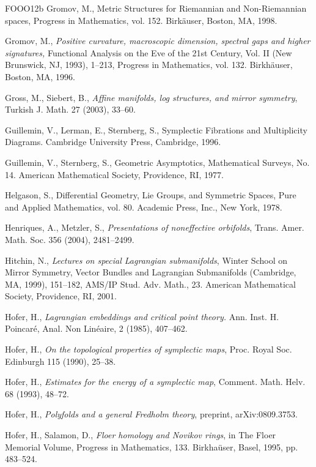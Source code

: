\begin{thebibliography}{FOOO12b}
 Gromov, M., Metric Structures for Riemannian and Non-Riemannian spaces, Progress in
  Mathematics, vol. 152. Birkäuser, Boston, MA, 1998.

 Gromov, M., \emph{Positive curvature, macroscopic dimension, spectral gaps and
  higher signatures,} Functional Analysis on the Eve of the 21st Century, Vol. II (New Brunswick, NJ,
  1993), 1–213, Progress in Mathe\-matics, vol. 132. Birkhäuser, Boston, MA, 1996.

 Gross, M., Siebert, B., \emph{Aﬃne manifolds, log structures, and mirror
  symmetry}, Turkish J. Math. 27 (2003), 33–60.

 Guillemin, V., Lerman, E., Sternberg, S., Symplectic Fibrations and Multiplicity
  Diagrams. Cambridge University Press, Cambridge, 1996.

 Guillemin, V., Sternberg, S., Geometric Asymptotics, Mathematical Surveys, No. 14.
  American Mathematical Society, Providence, RI, 1977.

 Helgason, S., Diﬀerential Geometry, Lie Groups, and Symmetric Spaces, Pure and
  Applied Mathematics, vol. 80. Academic Press, Inc., New York, 1978.

 Henriques, A., Metzler, S., \emph{Presentations of noneﬀective orbifolds}, Trans.
  Amer. Math. Soc. 356 (2004), 2481–2499.

 Hitchin, N., \emph{Lectures on special Lagrangian submanifolds}, Winter School on
  Mirror Symmetry, Vector Bundles and Lagrangian Submani\-folds (Cambridge, MA, 1999), 151–182, AMS/IP
  Stud. Adv. Math., 23. American Mathematical Society, Providence, RI, 2001.

 Hofer, H., \emph{Lagrangian embeddings and critical point theory.} Ann. Inst. H.
  Poincaré, Anal. Non Linéaire, 2 (1985), 407–462.

 Hofer, H., \emph{On the topological properties of symplectic maps}, Proc. Royal Soc.
  Edinburgh 115 (1990), 25–38.

 Hofer, H., \emph{Estimates for the energy of a symplectic map}, Comment. Math. Helv.
  68 (1993), 48–72.

 Hofer, H., \emph{Polyfolds and a general Fredholm theory}, preprint, arXiv:0809.3753.

 Hofer, H., Salamon, D., \emph{Floer homology and Novikov rings}, in The Floer
  Memorial Volume, Progress in Mathematics, 133. Birkhaüser, Basel, 1995, pp. 483–524.


\end{thebibliography}
